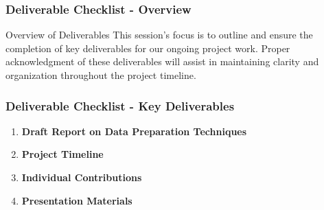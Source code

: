 \documentclass[aspectratio=169]{beamer}
\begin{document}
\begin{frame}[fragile]
    \frametitle{Deliverable Checklist - Overview}
    \begin{block}{Overview of Deliverables}
        This session's focus is to outline and ensure the completion of key deliverables for our ongoing project work. Proper acknowledgment of these deliverables will assist in maintaining clarity and organization throughout the project timeline.
    \end{block}
\end{frame}

\begin{frame}[fragile]
    \frametitle{Deliverable Checklist - Key Deliverables}
    \begin{enumerate}
        \item \textbf{Draft Report on Data Preparation Techniques}
        \item \textbf{Project Timeline}
        \item \textbf{Individual Contributions}
        \item \textbf{Presentation Materials}
    \end{enumerate}
\end{frame}
\end{document}
